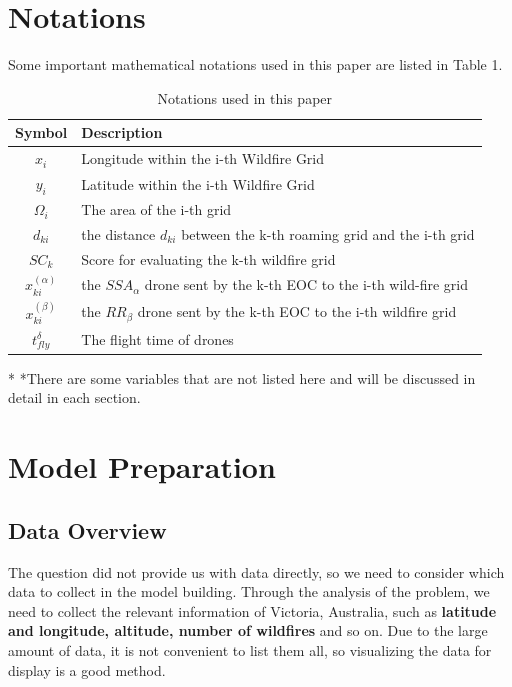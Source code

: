 \documentclass[12pt]{article}  %
\begin{document}
 \section{Notations}
 Some important mathematical notations used in this paper are listed in Table 1. 
 \begin{table}[htbp]
 \begin{center}
 \caption{Notations used in this paper}
 \begin{tabular}{c l}
 \toprule[2pt]
 \multicolumn{1}{m{3cm}}{\centering Symbol}
 &\multicolumn{1}{m{8cm}}{\centering Description }\\
 \midrule
 $x_i$& Longitude within the i-th Wildfire Grid \\
 $y_i$& Latitude within the i-th Wildfire Grid \\
 $\varOmega _i$& The area of the i-th grid\\
 $d_{ki}$& the distance $d_{ki}$ between the k-th roaming grid and the i-th grid \\
 $SC_k$ & Score for evaluating the k-th wildfire grid \\
 \vspace{5pt}%
 $x^{( \alpha )}_{ki}$ & the $SSA_\alpha$ drone sent by the k-th EOC to the i-th wild-fire grid\\
 \vspace{3pt}
 $x^{( \beta )}_{ki}$ & the $RR_\beta$ drone sent by the k-th EOC to the i-th wildfire grid\\
 $t_{fly}^{\delta}$ & The flight time of drones\\
 \bottomrule[2pt]
 \end{tabular}\label{tb:notation}
  \begin{tablenotes}
         \footnotesize
         \item[*] *There are some variables that are not listed here and will be discussed in detail in each section. %
       \end{tablenotes}
 \end{center}
 \end{table}
 \vspace{-1cm}%
 
 \section{Model Preparation}
 \subsection{Data Overview}
 The question did not provide us with data directly, so we need to consider which data to collect in the model building. Through the analysis of the problem, we need to collect the relevant information of Victoria, Australia, such as \textbf{latitude and longitude, altitude, number of wildfires} and so on. Due to the large amount of data, it is not convenient to list them all, so visualizing the data for display is a good method.
 
\end{document}
